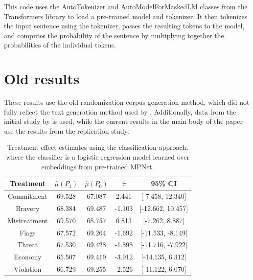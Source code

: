 \documentclass{article}
\begin{document}
This code uses the AutoTokenizer and AutoModelForMaskedLM classes from the Transformers library to load a pre-trained model and tokenizer. It then tokenizes the input sentence using the tokenizer, passes the resulting tokens to the model, and computes the probability of the sentence by multiplying together the probabilities of the individual tokens.

\section{Old results}

These results use the old randomization corpus generation method, which did not fully reflect the text generation method used by \cite{fong2021causal}. Additionally, data from the initial study by \cite{fong2021causal} is used, while the current results in the main body of the paper use the results from the replication study.

\begin{table}[!ht]
    \centering
    \begin{tabular}{c|cccc}
        \toprule
        Treatment & $\hat{\mu}(P_1)$ & $\hat{\mu}(P_0)$ & $\hat{\tau}$ & 95\% CI \\
        \midrule
        Commitment & 69.528 & 67.087 & \textcolor{green!50!black}{2.441} & [-7.458, 12.340] \\
        Bravery & 68.384 & 69.487 & \textcolor{red!80!black}{-1.103} & [-12.662, 10.457] \\
        Mistreatment & 69.570 & 68.757 & \textcolor{green!50!black}{0.813} & [-7.262, 8.887] \\
        Flags & 67.572 & 69.264 & \textcolor{red!80!black}{-1.692} & [-11.533, -8.149] \\
        Threat & 67.530 & 69.428 & \textcolor{red!80!black}{-1.898} & [-11.716, -7.922] \\
        Economy & 65.507 & 69.419 & \textcolor{red!80!black}{-3.912} & [-14.135, 6.312] \\
        Violation & 66.729 & 69.255 & \textcolor{red!80!black}{-2.526} & [-11.122, 6.070] \\
        \bottomrule
    \end{tabular}
    \caption{Treatment effect estimates using the classification approach, where the classifier is a logistic regression model learned over embeddings from pre-trained MPNet.}
    \label{tab:results_clf1_old}
\end{table}
\end{document}
